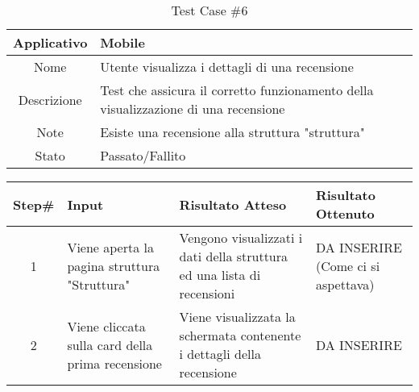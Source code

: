 
\begin{table}[H]
    \centering
    \footnotesize
    \caption{Test Case \#6}
    \begin{tabularx}{\textwidth}{|c|X|}
        \hline
        Applicativo & Mobile\\
        \hline
        Nome & Utente visualizza i dettagli di una recensione  \\
        \hline
        Descrizione & Test che assicura il corretto funzionamento della visualizzazione di una recensione\\
        \hline
        Note & Esiste una recensione alla struttura "struttura"\\
        \hline
        Stato & Passato/Fallito\\
        \hline

    \end{tabularx}
    \setlength{\tabcolsep}{8pt}
    \renewcommand{\arraystretch}{1.5}
\end{table}

\begin{table}[H]
    \footnotesize
    \begin{tabularx}{\textwidth}{|c|X|X|X|}
        \hline
        Step\# & Input & Risultato Atteso & Risultato Ottenuto \\
        \hline
         1 & Viene aperta la pagina struttura "Struttura"
         & Vengono visualizzati i dati della struttura ed una lista di recensioni
         &DA INSERIRE (Come ci si aspettava)\\
          \hline
        2 & Viene cliccata sulla card della prima recensione
        & Viene visualizzata la schermata contenente i dettagli della recensione
        & DA INSERIRE\\
\hline
    \end{tabularx}
\end{table}
    
       
